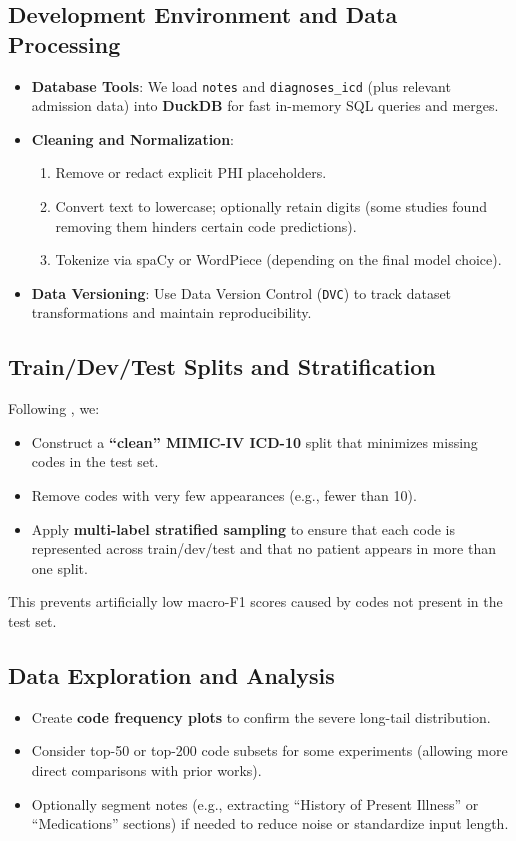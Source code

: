\documentclass[12pt,a4paper]{report}
\begin{document}
\subsection{Development Environment and Data Processing}
\begin{itemize}
    \item \textbf{Database Tools}: We load \texttt{notes} and \texttt{diagnoses\_icd} (plus relevant admission data) into \textbf{DuckDB} for fast in-memory SQL queries and merges.
    \item \textbf{Cleaning and Normalization}:
    \begin{enumerate}
        \item Remove or redact explicit PHI placeholders.
        \item Convert text to lowercase; optionally retain digits (some studies found removing them hinders certain code predictions).
        \item Tokenize via spaCy or WordPiece (depending on the final model choice).
    \end{enumerate}
    \item \textbf{Data Versioning}: Use Data Version Control (\texttt{DVC}) to track dataset transformations and maintain reproducibility.
\end{itemize}

\subsection{Train/Dev/Test Splits and Stratification}
Following \cite{edin2023automated}, we:
\begin{itemize}
    \item Construct a \textbf{“clean” MIMIC-IV ICD-10} split that minimizes missing codes in the test set.
    \item Remove codes with very few appearances (e.g., fewer than 10).
    \item Apply \textbf{multi-label stratified sampling} to ensure that each code is represented across train/dev/test and that no patient appears in more than one split.
\end{itemize}
This prevents artificially low macro-F1 scores caused by codes not present in the test set.

\subsection{Data Exploration and Analysis}
\begin{itemize}
    \item Create \textbf{code frequency plots} to confirm the severe long-tail distribution.
    \item Consider top-50 or top-200 code subsets for some experiments (allowing more direct comparisons with prior works).
    \item Optionally segment notes (e.g., extracting “History of Present Illness” or “Medications” sections) if needed to reduce noise or standardize input length.
\end{itemize}
\end{document}
